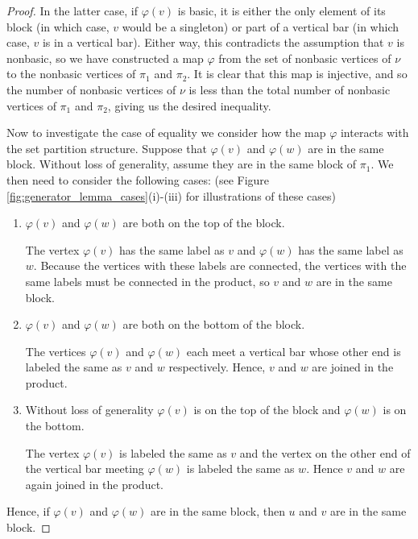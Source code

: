 \documentclass[10pt]{amsart}
\theoremstyle{definition}
\theoremstyle{definition}
\theoremstyle{plain}
\theoremstyle{remark}
\theoremstyle{plain}
\theoremstyle{plain}
\begin{document}
\begin{proof}
    In the latter case, if $\varphi(v)$ is basic, it is either the only element of its block (in which case, $v$ would be a singleton) or part of a vertical bar (in which case, $v$ is in a vertical bar). Either way, this contradicts the assumption that $v$ is nonbasic, so we have constructed a map $\varphi$ from the set of nonbasic vertices of $\nu$ to the nonbasic vertices of $\pi_1$ and $\pi_2$. It is clear that this map is injective, and so the number of nonbasic vertices of $\nu$ is less than the total number of nonbasic vertices of 
    $\pi_1$ and $\pi_2$, giving us the desired inequality.

    Now to investigate the case of equality we consider how the map $\varphi$ interacts with the set partition structure. Suppose that $\varphi(v)$ and $\varphi(w)$ are in the same block. Without loss of generality, assume they are in the same block of $\pi_1$. We then need to consider the following cases: (see Figure \ref{fig:generator_lemma_cases}(i)-(iii) for illustrations of these cases)

    \begin{enumerate}
        \item[(i)] $\varphi(v)$ and $\varphi(w)$ are both on the top of the block.

        The vertex $\varphi(v)$ has the same label as $v$ and $\varphi(w)$ has the same label as $w$. Because the vertices with these labels are connected, the vertices with the same labels must be connected in the product, so $v$ and $w$ are in the same block.

        \item[(ii)] $\varphi(v)$ and $\varphi(w)$ are both on the bottom of the block.

        The vertices $\varphi(v)$ and $\varphi(w)$ each meet a vertical bar whose other end is labeled the same as $v$ and $w$ respectively. Hence, $v$ and $w$ are joined in the product.

        \item[(iii)] Without loss of generality $\varphi(v)$ is on the top of the block and $\varphi(w)$ is on the bottom.

        The vertex $\varphi(v)$ is labeled the same as $v$ and the vertex on the other end of the vertical bar meeting $\varphi(w)$ is labeled the same as $w$. Hence $v$ and $w$ are again joined in the product.
    \end{enumerate}

    Hence, if $\varphi(v)$ and $\varphi(w)$ are in the same block, then $u$ and $v$ are in the same block.


\end{proof}
\end{document}
